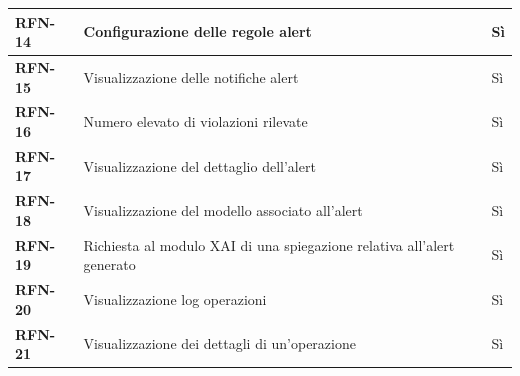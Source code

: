 \begin{longtable}{|l|p{}|l|}
        \textbf{RFN-14} & Configurazione delle regole alert & Sì \\
        \hline
        \textbf{RFN-15} & Visualizzazione delle notifiche alert & Sì \\
        \hline
        \textbf{RFN-16} & Numero elevato di violazioni rilevate & Sì \\
        \hline
        \textbf{RFN-17} & Visualizzazione del dettaglio dell'alert & Sì \\
        \hline
        \textbf{RFN-18} & Visualizzazione del modello associato all'alert & Sì \\
        \hline
        \textbf{RFN-19} & Richiesta al modulo XAI di una spiegazione relativa all'alert generato & Sì \\
        \hline
        \textbf{RFN-20} & Visualizzazione log operazioni & Sì \\
        \hline
        \textbf{RFN-21} & Visualizzazione dei dettagli di un'operazione & Sì \\
        \hline
    \end{longtable}

\newpage

